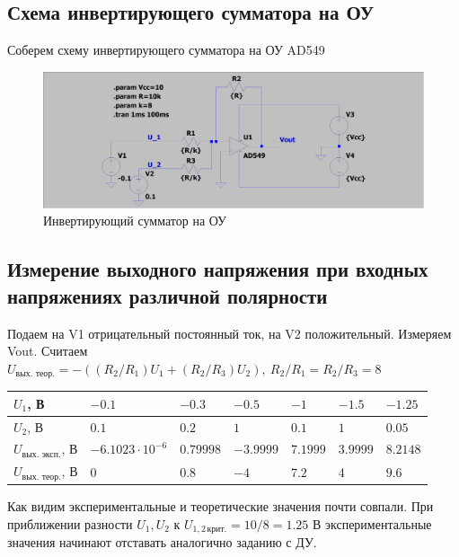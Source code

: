\documentclass[a4paper, 12pt]{article}
\begin{document}
    \subsection{Схема инвертирующего сумматора на ОУ}
    Соберем схему инвертирующего сумматора на ОУ AD549
    \begin{figure}[H]
        \centering
        \includegraphics[scale=0.22]{scheme4.png}
        \captionsetup{skip=0pt}
        \caption{Инвертирующий сумматор на ОУ}
        \label{fig:scheme4}
    \end{figure}

    
    \subsection{Измерение выходного напряжения при входных напряжениях различной полярности}
    Подаем на V1 отрицательный постоянный ток, на V2 положительный. Измеряем Vout. Считаем
    $U_{\text{вых. теор.}}=-\left( \left(R_2/R_1\right)U_1+\left(R_2/R_3\right)U_2 \right),\ R_2/R_1=R_2/R_3=8$
    \begin{center}
        \begin{tabular}{ | m{6em} | m{4em}| m{4em} | m{4em} | m{4em} | m{4em} | m{4em} | } 
        \hline
        $U_1$, В& $-0.1$ &$-0.3$ &$-0.5$ &$-1$& $-1.5$ & $-1.25$\\ 
        \hline
        $U_2$, В& $0.1$ &$0.2$ &$1$ &$0.1$& $1$ & $0.05$\\ 
        \hline
        $U_{\text{вых. эксп.}}$, В& $-6.1023\cdot10^{-6}$ &$0.79998$ &$-3.9999$ &$7.1999$& $3.9999$ & $8.2148$\\
        \hline
        $U_{\text{вых. теор.}}$, В& $0$ &$0.8$ &$-4$ &$7.2$& $4$ & $9.6$\\
        \hline
        \end{tabular}
    \end{center}
    Как видим экспериментальные и теоретические значения почти совпали.
    При приближении разности $U_1,U_2$ к $U_{1,2\,\text{крит.}}=10/8=1.25$ В
    экспериментальные значения начинают отставать аналогично заданию с ДУ.
\end{document}

